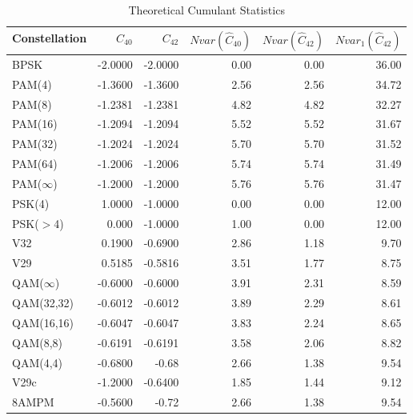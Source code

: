 \begin{table*}[h!]
\centering
\caption{Theoretical Cumulant Statistics \cite{swami2000}}
\begin{tabular}{ l | r | r| r| r| r } \hline
Constellation	& $C_{40}$ & $C_{42}$ & $N var(\hat{C}_{40})$ & $N var(\hat{C}_{42}) $ & $N var_1 (\hat{C}_{42})$ \\ \hline \hline
BPSK & -2.0000 & -2.0000 & 0.00 & 0.00 & 36.00 \\ \hline \hline
PAM(4) & -1.3600 & -1.3600 & 2.56 & 2.56 & 34.72 \\ 
PAM(8) & -1.2381 & -1.2381 & 4.82 & 4.82 & 32.27 \\
PAM(16) & -1.2094 & -1.2094 & 5.52 & 5.52 & 31.67 \\
PAM(32) & -1.2024 & -1.2024 & 5.70 & 5.70 & 31.52 \\ 
PAM(64) & -1.2006 & -1.2006 & 5.74 & 5.74 & 31.49 \\
PAM($\infty$) & -1.2000 & -1.2000 & 5.76 & 5.76 & 31.47 \\ \hline \hline
PSK(4) & 1.0000 & -1.0000 & 0.00 & 0.00 & 12.00 \\ \hline
PSK($>$4) & 0.000 & -1.0000 & 1.00 & 0.00 & 12.00 \\ \hline \hline
V32 & 0.1900 & -0.6900 & 2.86 & 1.18 & 9.70 \\ \hline
V29 & 0.5185 & -0.5816 & 3.51 & 1.77 & 8.75 \\
QAM($\infty$) & -0.6000 & -0.6000 & 3.91 & 2.31 & 8.59 \\
QAM(32,32) & -0.6012 & -0.6012 & 3.89 & 2.29 & 8.61 \\
QAM(16,16) & -0.6047 & -0.6047 & 3.83 & 2.24 & 8.65 \\ 
QAM(8,8) & -0.6191 & -0.6191 & 3.58 & 2.06 & 8.82 \\
QAM(4,4) & -0.6800 & -0.68 & 2.66 & 1.38 & 9.54 \\ \hline
V29c & -1.2000 & -0.6400 & 1.85 & 1.44 & 9.12 \\ \hline
8AMPM & -0.5600 & -0.72 & 2.66 & 1.38 & 9.54 \\ \hline 
\end{tabular}
\label{tab:cumulantStat}
\end{table*}


